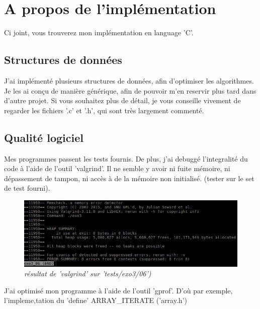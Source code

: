 \documentclass[10pt]{article}
\begin{document}
	\newpage
	\section{A propos de l'implémentation}
		Ci joint, vous trouverez mon implémentation en language 'C'.
		\subsection{Structures de données}
		J'ai implémenté plusieurs structures de données, afin d'optimiser les algorithmes. Je les ai conçu de manière générique,
		afin de pouvoir m'en reservir plus tard dans d'autre projet. Si vous souhaitez plus de détail, je vous
		conseille vivement de regarder les fichiers '.c' et '.h', qui sont très largement commenté.
		
		\subsection{Qualité logiciel}
			Mes programmes passent les tests fournis.\newline    
			De plus, j'ai debuggé l'integralité du code à l'aide de l'outil 'valgrind'.
			Il ne semble y avoir ni fuite mémoire, ni dépassement de tampon, ni accès à de la mémoire non initialisé.
			(tester sur le set de test fourni).
			\begin{figure}[H]
				\begin{center}
					\includegraphics[width=12cm,height=\textheight,keepaspectratio]{./images/valgrind.png}
				\end{center}
				\caption{\textit{résultat de 'valgrind' sur 'tests/exo3/06')}}
			\end{figure}
			J'ai optimisé mon programme à l'aide de l'outil 'gprof'.
			D'où par exemple, l'impleme,tation du 'define' ARRAY\_ITERATE ('array.h')
	
\end{document}
